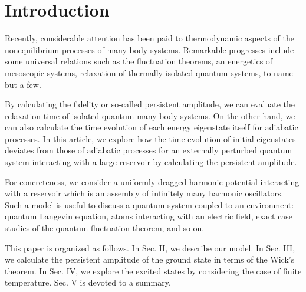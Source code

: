 \documentclass[aps,pre,twocolumn,eqsecnum,showpacs,superscriptaddress]{revtex4}
\begin{document}

\maketitle
\section{Introduction}
Recently, considerable attention has been paid to thermodynamic aspects of the nonequilibrium processes of many-body systems. Remarkable progresses include some universal relations such as the fluctuation theorems\cite{Evans1,Gallavotti1,Esposito1,Utsumi1,Andrieux1,Tameem1,Monnai1}, an energetics of mesoscopic systems\cite{Sekimoto1,Wang1,Seifert1,Roncaglia1,Nakamura1}, relaxation of thermally isolated quantum systems\cite{Hazibabich1,Kinoshita1,Rigol1}, to name but a few.   

By calculating the fidelity or so-called persistent amplitude, we can evaluate the relaxation time of isolated quantum many-body systems\cite{Monnai3,Santos1,Reimann1}. 
On the other hand, we can also calculate the time evolution of each energy eigenstate itself for adiabatic processes. 
In this article, we explore how the time evolution of initial eigenstates deviates from those of adiabatic processes for an externally perturbed quantum system interacting with a large reservoir by calculating the persistent amplitude.

For concreteness, we consider a uniformly dragged harmonic potential interacting with a reservoir which is an assembly of infinitely many harmonic oscillators. Such a model is useful to discuss a quantum system coupled to an environment: quantum Langevin equation\cite{Ford1,Zwanzig1}, atoms interacting with an electric field\cite{Gardiner1}, exact case studies of the quantum fluctuation theorem\cite{Monnai1,Monnai2}, and so on.

This paper is organized as follows.
In Sec. II, we describe our model.
In Sec. III, we calculate the persistent amplitude of the ground state in terms of the Wick's theorem.
In Sec. IV, we explore the excited states by considering the case of finite temperature.
Sec. V is devoted to a summary.
\end{document}
